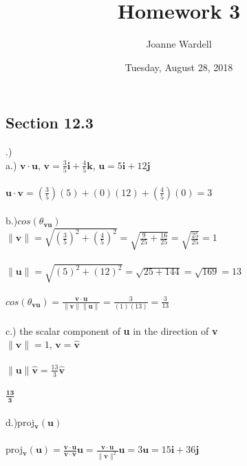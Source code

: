 \documentclass[12pt]{article}
\title{\vspace{-2.0cm}Homework 3}
\author{Joanne Wardell}
\date{Tuesday, August 28, 2018}
\begin{document}
\maketitle

\subsection*{Section 12.3}

.)\\
\noindent a.) $\mathbf{v} \cdot \mathbf{u}$, \hspace{10pt} 
$\mathbf{v} = \frac{3}{5} \mathbf{i} + \frac{4}{5} \mathbf{k} $, \hspace{10pt}
$\mathbf{u} = 5\mathbf{i} + 12\mathbf{j}$\\\\
$\mathbf{u} \cdot \mathbf{v} = (\frac{3}{5})(5) + (0)(12) +  (\frac{4}{5})(0) = 3$\\\\
\noindent b.)$cos(\theta_{\mathbf{vu}})$\\
$ \| \mathbf{v} \| = \sqrt{(\frac{3}{5})^{2} + (\frac{4}{5})^{2}} = \sqrt{\frac{9}{25} + \frac{16}{25}} = \sqrt{\frac{25}{25}} = 1$\\\\
$\| \mathbf{u} \| = \sqrt{(5)^{2} + (12)^{2}} = \sqrt{25 + 144} = \sqrt{169} = 13$\\\\
$cos(\theta_{\mathbf{vu}}) = \frac{\mathbf{v} \cdot \mathbf{u}}{\| \mathbf{v} \| \| \mathbf{u} \|} = \frac{3}{(1)(13)} = \frac{3}{13}$ \\\\
\noindent c.) the scalar component of \textbf{u} in the direction of \textbf{v}\\
$\|\mathbf{v} \| = 1$, \hspace{10pt} $\mathbf{v} = \hat{\mathbf{v}}$\\\\
$\|\mathbf{u} \| \hat{\mathbf{v}} = \frac{13}{3}\hat{\mathbf{v}}$\\\\
$\mathbf{\frac{13}{3}}$\\\\

\noindent d.)proj$_{\mathbf{v}}(\mathbf{u})$\\\\
proj$_{\mathbf{v}}(\mathbf{u}) = \frac{\mathbf{v \cdot u}}{\mathbf{v \cdot v}}\mathbf{u} = \frac{\mathbf{v \cdot u}}{\|\mathbf{v} \|^{2}}\mathbf{u} = 3\mathbf{u}  = 15\mathbf{i} + 36\mathbf{j}$\\
\end{document}
